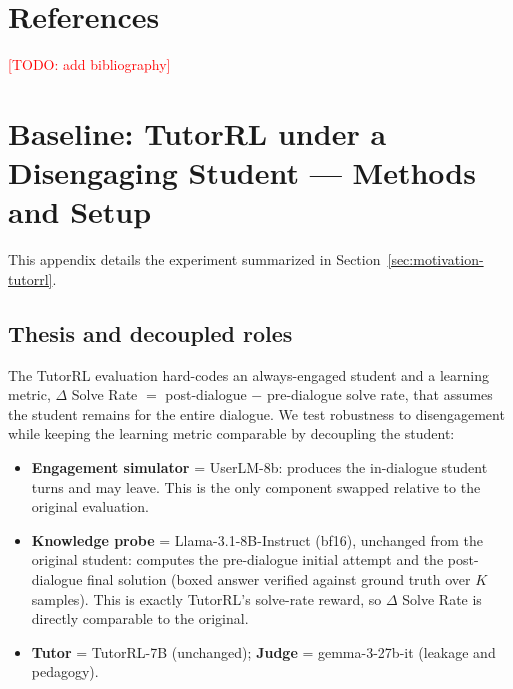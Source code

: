 \documentclass[11pt]{article}
\newcommand{\todo}[1]{\textcolor{red}{[TODO: #1]}}
\begin{document}
\section*{References}
\todo{add bibliography}

\appendix

\section{Baseline: TutorRL under a Disengaging Student --- Methods and Setup}
\label{app:baseline}

This appendix details the experiment summarized in
Section~\ref{sec:motivation-tutorrl}.

\subsection{Thesis and decoupled roles}
The TutorRL evaluation hard-codes an always-engaged student and a learning
metric, $\Delta$ Solve Rate $=$ post-dialogue $-$ pre-dialogue solve rate, that
assumes the student remains for the entire dialogue. We test robustness to
disengagement while keeping the learning metric comparable by decoupling the
student:
\begin{itemize}
  \item \textbf{Engagement simulator} = UserLM-8b: produces the in-dialogue
    student turns and may leave. This is the only component swapped relative to
    the original evaluation.
  \item \textbf{Knowledge probe} = Llama-3.1-8B-Instruct (bf16), unchanged from
    the original student: computes the pre-dialogue initial attempt and the
    post-dialogue final solution (boxed answer verified against ground truth over
    $K$ samples). This is exactly TutorRL's solve-rate reward, so $\Delta$ Solve
    Rate is directly comparable to the original.
  \item \textbf{Tutor} = TutorRL-7B (unchanged); \textbf{Judge} = gemma-3-27b-it
    (leakage and pedagogy).
\end{itemize}
\end{document}
